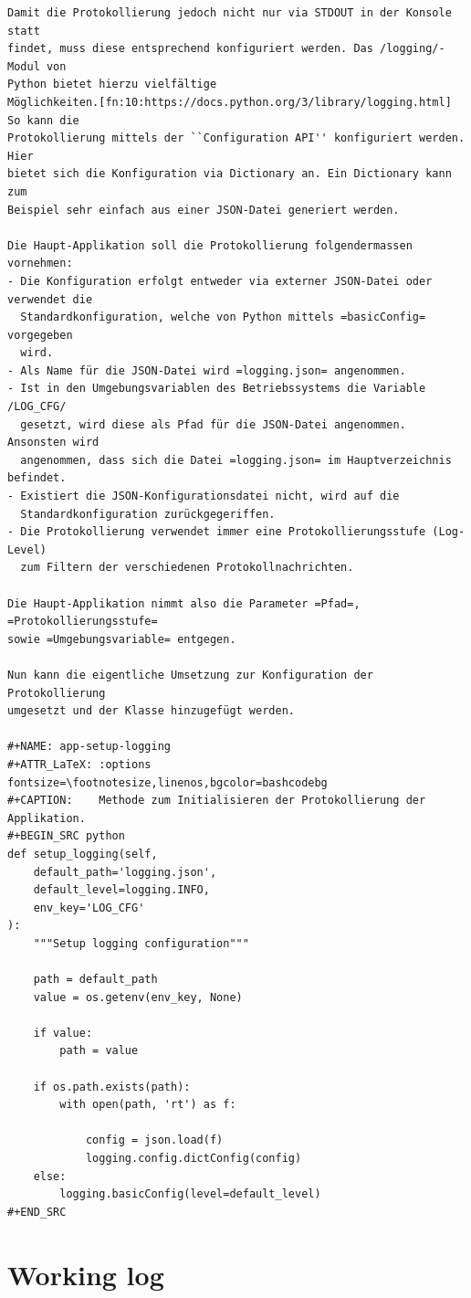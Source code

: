 \documentclass[10pt, openright, notitlepage]{scrreprt}
\begin{document}
\begin{verbatim}
Damit die Protokollierung jedoch nicht nur via STDOUT in der Konsole statt
findet, muss diese entsprechend konfiguriert werden. Das /logging/-Modul von
Python bietet hierzu vielfältige
Möglichkeiten.[fn:10:https://docs.python.org/3/library/logging.html] So kann die
Protokollierung mittels der ``Configuration API'' konfiguriert werden. Hier
bietet sich die Konfiguration via Dictionary an. Ein Dictionary kann zum
Beispiel sehr einfach aus einer JSON-Datei generiert werden.

Die Haupt-Applikation soll die Protokollierung folgendermassen vornehmen:
- Die Konfiguration erfolgt entweder via externer JSON-Datei oder verwendet die
  Standardkonfiguration, welche von Python mittels =basicConfig= vorgegeben
  wird.
- Als Name für die JSON-Datei wird =logging.json= angenommen.
- Ist in den Umgebungsvariablen des Betriebssystems die Variable /LOG_CFG/
  gesetzt, wird diese als Pfad für die JSON-Datei angenommen. Ansonsten wird
  angenommen, dass sich die Datei =logging.json= im Hauptverzeichnis befindet.
- Existiert die JSON-Konfigurationsdatei nicht, wird auf die
  Standardkonfiguration zurückgegeriffen.
- Die Protokollierung verwendet immer eine Protokollierungsstufe (Log-Level)
  zum Filtern der verschiedenen Protokollnachrichten.

Die Haupt-Applikation nimmt also die Parameter =Pfad=, =Protokollierungsstufe=
sowie =Umgebungsvariable= entgegen.

Nun kann die eigentliche Umsetzung zur Konfiguration der Protokollierung
umgesetzt und der Klasse hinzugefügt werden.

#+NAME: app-setup-logging
#+ATTR_LaTeX: :options fontsize=\footnotesize,linenos,bgcolor=bashcodebg
#+CAPTION:    Methode zum Initialisieren der Protokollierung der Applikation.
#+BEGIN_SRC python
def setup_logging(self,
    default_path='logging.json',
    default_level=logging.INFO,
    env_key='LOG_CFG'
):
    """Setup logging configuration"""

    path = default_path
    value = os.getenv(env_key, None)

    if value:
        path = value

    if os.path.exists(path):
        with open(path, 'rt') as f:

            config = json.load(f)
            logging.config.dictConfig(config)
    else:
        logging.basicConfig(level=default_level)
#+END_SRC
\end{verbatim}

\chapter{Working log}
\label{sec:org7483b2e}
\end{document}
